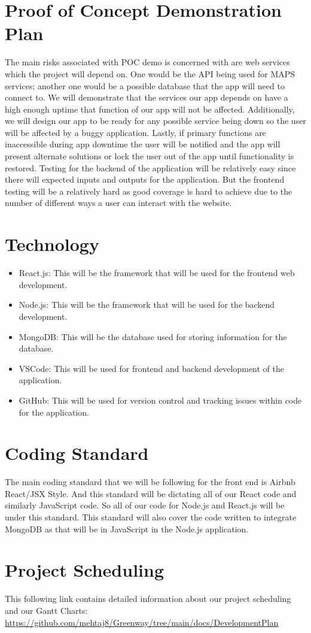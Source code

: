 \documentclass{article}
\begin{document}
\section{Proof of Concept Demonstration Plan}

The main risks associated with POC demo is concerned with are web services which the project will 
depend on. One would be the API being used for MAPS services; another one would be a possible database 
that the app will need to connect to. We will demonstrate that the services our app depends on have a 
high enough uptime that function of our app will not be affected. Additionally, we will design our app 
to be ready for any possible service being down so the user will be affected by a buggy application. Lastly, 
if primary functions are inaccessible during app downtime the user will be notified and the app will present 
alternate solutions or lock the user out of the app until functionality is restored. Testing for the backend 
of the application will be relatively easy since there will expected inputs and outputs for the application. 
But the frontend testing will be a relatively hard as good coverage is hard to achieve due to the number of 
different ways a user can interact with the website. 

\section{Technology}

\begin{itemize}
\item React.js: This will be the framework that will be used for the frontend web development.
\item Node.js: This will be the framework that will be used for the backend development.
\item MongoDB: This will be the database used for storing information for the database.
\item VSCode: This will be used for frontend and backend development of the application.
\item GitHub: This will be used for version control and tracking issues within code for the application.
\end{itemize}

\section{Coding Standard}
The main coding standard that we will be following for the front end is Airbnb React/JSX Style. And this standard will be dictating all of our React code and similarly JavaScript code. So all of our code for Node.js and React.js will be under this standard. This standard will also cover the code written to integrate MongoDB as that will be in JavaScript in the Node.js application.

\section{Project Scheduling}
This following link contains detailed information about our project scheduling and our Gantt Charts:\\
\url{https://github.com/mehtaj8/Greenway/tree/main/docs/DevelopmentPlan}
\end{document}
